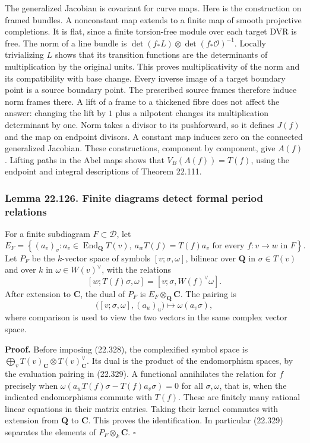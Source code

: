 \documentclass[
  11pt,
  a4paper,
]{article}
\begin{document}
The generalized Jacobian is covariant for curve maps. Here is the
construction on framed bundles. A nonconstant map extends to a finite
map of smooth projective completions. It is flat, since a finite
torsion-free module over each target DVR is free. The norm of a line
bundle is \(\det(f_*L)\otimes\det(f_*\mathcal O)^{-1}\). Locally
trivializing \(L\) shows that its transition functions are the
determinants of multiplication by the original units. This proves
multiplicativity of the norm and its compatibility with base change.
Every inverse image of a target boundary point is a source boundary
point. The prescribed source frames therefore induce norm frames there.
A lift of a frame to a thickened fibre does not affect the answer:
changing the lift by \(1\) plus a nilpotent changes its multiplication
determinant by one. Norm takes a divisor to its pushforward, so it
defines \(J(f)\) and the map on endpoint divisors. A constant map
induces zero on the connected generalized Jacobian. These constructions,
component by component, give \(A(f)\). Lifting paths in the Abel maps
shows that \(V_B(A(f))=T(f)\), using the endpoint and integral
descriptions of Theorem 22.111.

\subsubsection{Lemma 22.126. Finite diagrams detect formal period
relations}\label{lemma-22.126.-finite-diagrams-detect-formal-period-relations}

For a finite subdiagram \(F\subset\mathcal D\), let \[
 E_F=\left\{(a_v)_v:
    a_v\in\operatorname{End}_{\mathbf Q}T(v),\
    a_wT(f)=T(f)a_v\text{ for every }f:v\to w\text{ in }F\right\}.
 \tag{22.327}
\] Let \(P_F\) be the \(k\)-vector space of symbols
\([v;\sigma,\omega]\), bilinear over \(\mathbf Q\) in \(\sigma\in T(v)\)
and over \(k\) in \(\omega\in W(v)^\vee\), with the relations \[
 [w;T(f)\sigma,\omega]=[v;\sigma,W(f)^\vee\omega].
 \tag{22.328}
\] After extension to \(\mathbf C\), the dual of \(P_F\) is
\(E_F\otimes_{\mathbf Q}\mathbf C\). The pairing is \[
 \bigl([v;\sigma,\omega],(a_u)_u\bigr)
          \longmapsto \omega(a_v\sigma),
 \tag{22.329}
\] where comparison is used to view the two vectors in the same complex
vector space.

\textbf{Proof.} Before imposing (22.328), the complexified symbol space
is \(\bigoplus_v T(v)_{\mathbf C}\otimes
T(v)_{\mathbf C}^{\vee}\). Its dual is the product of the endomorphism
spaces, by the evaluation pairing in (22.329). A functional annihilates
the relation for \(f\) precisely when
\(\omega(a_wT(f)\sigma-T(f)a_v\sigma)=0\) for all \(\sigma,\omega\),
that is, when the indicated endomorphisms commute with \(T(f)\). These
are finitely many rational linear equations in their matrix entries.
Taking their kernel commutes with extension from \(\mathbf Q\) to
\(\mathbf C\). This proves the identification. In particular (22.329)
separates the elements of \(P_F\otimes_k\mathbf C\). \(\square\)
\end{document}
